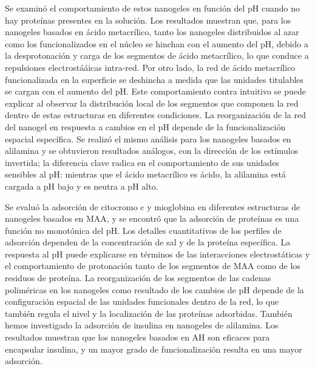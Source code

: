 Se examin\'o el comportamiento de estos nanogeles en funci\'on del pH cuando no hay prote\'inas presentes en la soluci\'on.
Los resultados muestran que, para los nanogeles basados en \'acido metacr\'ilico, tanto los nanogeles distribuidos al azar como los funcionalizados en el n\'ucleo se hinchan con el aumento del pH, debido a la desprotonaci\'on y carga de los segmentos de \'acido metacr\'ilico, lo que conduce a repulsiones electrostá\'aicas intra-red.
Por otro lado, la red de \'acido metacr\'ilico funcionalizada en la superficie se deshincha a medida que las unidades titulables se cargan con el aumento del pH.
Este comportamiento contra intuitivo se puede explicar al observar la distribuci\'on local de los segmentos que componen la red dentro de estas estructuras en diferentes condiciones.
La reorganizaci\'on de la red del nanogel en respuesta a cambios en el pH depende de la funcionalizaci\'on espacial espec\'ifica.
Se realiz\'o el mismo an\'alisis para los nanogeles basados en alilamina y se obtuvieron resultados an\'alogos, con la direcci\'on de los est\'imulos invertida;
la diferencia clave radica en el comportamiento de sus unidades sensibles al pH: mientras que el \'acido metacr\'ilico es \'acido, la alilamina est\'a cargada a pH bajo y es neutra a pH alto.


Se evalu\'o la adsorci\'on de citocromo c y mioglobina en diferentes estructuras de nanogeles basados en MAA, y se encontr\'o que la adsorci\'on de prote\'inas es una funci\'on no monot\'onica del pH.
Los detalles cuantitativos de los perfiles de adsorci\'on dependen de la concentraci\'on de sal y de la prote\'ina espec\'ifica.
La respuesta al pH puede explicarse en t\'erminos de las interacciones electrost\'aticas y el comportamiento de protonaci\'on tanto de los segmentos de MAA como de los residuos de prote\'ina.
La reorganizaci\'on de los segmentos de las cadenas polim\'ericas en los nanogeles como resultado de los cambios de pH depende de la configuraci\'on espacial de las unidades funcionales dentro de la red, lo que tambi\'en regula el nivel y la localizaci\'on de las prote\'inas adsorbidas.
Tambi\'en hemos investigado la adsorci\'on de insulina en nanogeles de alilamina.
Los  resultados muestran que los nanogeles basados en AH son eficaces para encapsular insulina, y un mayor grado de funcionalizaci\'on resulta en una mayor adsorci\'on.

